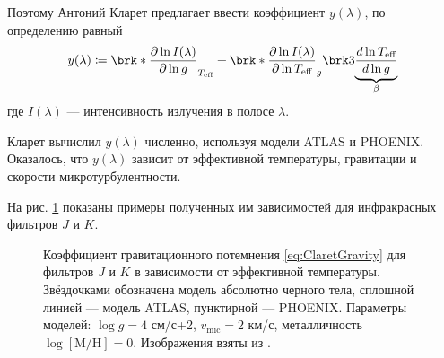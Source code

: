 Поэтому Антоний Кларет предлагает \cite{ClaretGravity} ввести коэффициент $y(\lambda)$, по определению равный
\begin{equation}
y(\lambda)
\coloneq \brk*{
    \frac{\partial \ln I(\lambda)}{\partial \ln g}
}_{T_\text{eff}}
+\brk*{
    \frac{\partial \ln I(\lambda)}{\partial \ln T_\text{eff}}
}_g
\brk3{
    \underbrace{
        \frac{d \ln T_\text{eff}}{d \ln g}
    }_{\beta}
}
\label{eq:ClaretGravity}
\end{equation}
где $I(\lambda)$ --- интенсивность излучения в полосе $\lambda$.

Кларет вычислил $y(\lambda)$ численно, используя модели ATLAS и PHOENIX. Оказалось, что $y(\lambda)$ зависит от эффективной температуры, гравитации и скорости микротурбулентности.

На рис. \ref{fig:ClaretGravity} показаны примеры полученных им зависимостей для инфракрасных фильтров $J$ и $K$.

\begin{figure}[h]
\centering
{}
\caption{Коэффициент гравитационного потемнения \eqref{eq:ClaretGravity} для фильтров $J$ и $K$ в зависимости от эффективной температуры.
Звёздочками обозначена модель абсолютно черного тела, сплошной линией --- модель ATLAS, пунктирной --- PHOENIX. Параметры моделей: $\log g = 4$ см/с+2, $v_\text{mic} = 2$ км/с, металличность $\log [\text{M}/\text{H}] = 0$.
Изображения взяты из \cite{ClaretGravity}.}
\label{fig:ClaretGravity}
\end{figure}

